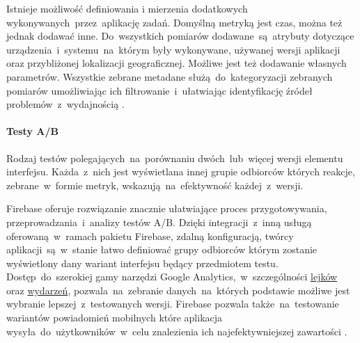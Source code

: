 Istnieje możliwość definiowania i mierzenia dodatkowych wykonywanych~przez~aplikację zadań. Domyślną metryką jest czas, można też jednak dodawać inne. Do~wszystkich pomiarów dodawane~są~atrybuty dotyczące urządzenia~i~systemu~na~którym były wykonywane, używanej wersji aplikacji oraz przybliżonej lokalizacji geograficznej. Możliwe jest też dodawanie własnych parametrów. Wszystkie zebrane metadane służą~do~kategoryzacji zebranych pomiarów umożliwiając ich  filtrowanie~i~ułatwiając identyfikację źródeł problemów~z~wydajnością \cite{Fb_Pref_Monitor}.

\paragraph{Testy A/B}
Rodzaj testów polegających~na~porównaniu dwóch~lub~więcej wersji elementu interfejsu. Każda~z~nich jest wyświetlana innej grupie odbiorców których reakcje, zebrane~w~formie metryk, wskazują~na~efektywność każdej~z~wersji. 

Firebase oferuje rozwiązanie znacznie ułatwiające proces przygotowywania, przeprowadzania~i~analizy testów A/B. Dzięki integracji~z~inną usługą oferowaną~w~ramach pakietu Firebase, zdalną konfiguracją, twórcy aplikacji~są~w~stanie łatwo definiować grupy odbiorców którym zostanie wyświetlony dany wariant interfejsu będący przedmiotem testu. Dostęp~do~szerokiej gamy narzędzi Google Analytics,~w~szczególności \hyperref[par:ga-funnels]{lejków} oraz  \hyperref[par:ga-events]{wydarzeń}, pozwala~na~zebranie danych~na~których podstawie możliwe jest wybranie lepszej~z~testowanych wersji. Firebase pozwala także~na~testowanie wariantów powiadomień mobilnych które aplikacja wysyła~do~użytkowników~w~celu znalezienia ich najefektywniejszej zawartości \cite{Fb_AB_Testing}.
